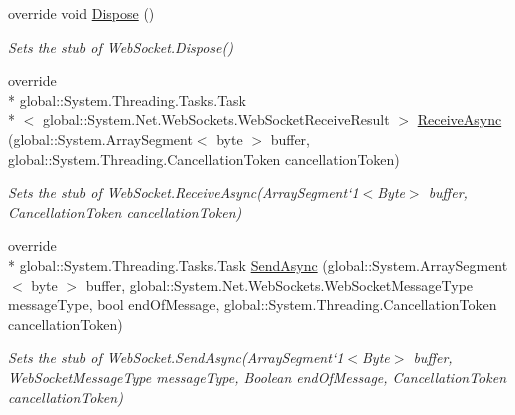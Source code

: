\begin{DoxyCompactItemize}
override void \hyperlink{class_system_1_1_net_1_1_web_sockets_1_1_fakes_1_1_stub_web_socket_a17100d2fe664583912518aa7e906cf8d}{Dispose} ()
\begin{DoxyCompactList}\small\item\em Sets the stub of Web\-Socket.\-Dispose()\end{DoxyCompactList}\item 
override \\*
global\-::\-System.\-Threading.\-Tasks.\-Task\\*
$<$ global\-::\-System.\-Net.\-Web\-Sockets.\-Web\-Socket\-Receive\-Result $>$ \hyperlink{class_system_1_1_net_1_1_web_sockets_1_1_fakes_1_1_stub_web_socket_a1922b123c701b5bf93dc2c946c19ba44}{Receive\-Async} (global\-::\-System.\-Array\-Segment$<$ byte $>$ buffer, global\-::\-System.\-Threading.\-Cancellation\-Token cancellation\-Token)
\begin{DoxyCompactList}\small\item\em Sets the stub of Web\-Socket.\-Receive\-Async(Array\-Segment`1$<$Byte$>$ buffer, Cancellation\-Token cancellation\-Token)\end{DoxyCompactList}\item 
override \\*
global\-::\-System.\-Threading.\-Tasks.\-Task \hyperlink{class_system_1_1_net_1_1_web_sockets_1_1_fakes_1_1_stub_web_socket_ace5f0ef25854082f41c062aaf42cc327}{Send\-Async} (global\-::\-System.\-Array\-Segment$<$ byte $>$ buffer, global\-::\-System.\-Net.\-Web\-Sockets.\-Web\-Socket\-Message\-Type message\-Type, bool end\-Of\-Message, global\-::\-System.\-Threading.\-Cancellation\-Token cancellation\-Token)
\begin{DoxyCompactList}\small\item\em Sets the stub of Web\-Socket.\-Send\-Async(Array\-Segment`1$<$Byte$>$ buffer, Web\-Socket\-Message\-Type message\-Type, Boolean end\-Of\-Message, Cancellation\-Token cancellation\-Token)\end{DoxyCompactList}\end{DoxyCompactItemize}
